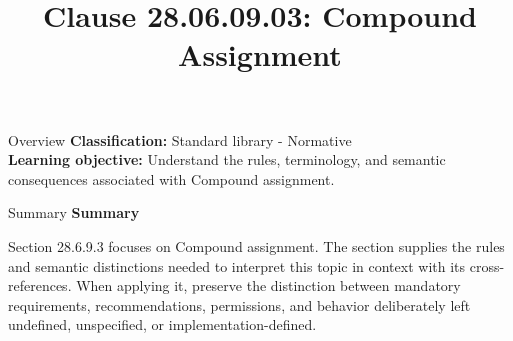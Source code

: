 \documentclass[10pt,letterpaper]{article}
\title{Clause 28.06.09.03: Compound Assignment}
\author{}
\date{}
\begin{document}
\maketitle
\begin{CornellOverviewBox}{Overview}
\textbf{Classification:} Standard library - Normative\\[2pt]
\textbf{Learning objective:} Understand the rules, terminology, and semantic consequences associated with Compound assignment.
\end{CornellOverviewBox}\begin{CornellSummaryBox}{Summary}
{\sffamily\bfseries\color{Accent} Summary}\par\vspace{3pt}Section 28.6.9.3 focuses on Compound assignment. The section supplies the rules and semantic distinctions needed to interpret this topic in context with its cross-references. When applying it, preserve the distinction between mandatory requirements, recommendations, permissions, and behavior deliberately left undefined, unspecified, or implementation-defined.
\end{CornellSummaryBox}
\end{document}
